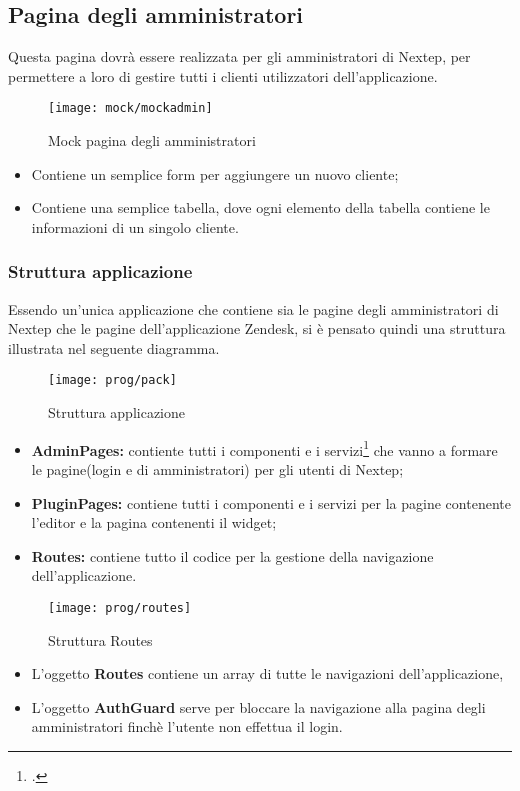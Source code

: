 \subsection{Pagina degli amministratori}
Questa pagina dovrà essere realizzata per gli amministratori di Nextep, per permettere a loro di gestire tutti i clienti utilizzatori dell'applicazione. 
\begin{figure}[!h] 
	\centering 
	\texttt{[image: mock/mockadmin]} 
	\caption{Mock pagina degli amministratori}
\end{figure} 
\newpage 
\begin{itemize}
	\item Contiene un semplice form per aggiungere un nuovo cliente;
	\item Contiene una semplice tabella, dove ogni elemento della tabella contiene le informazioni di un singolo cliente.
\end{itemize}
\subsubsection{Struttura applicazione}
Essendo un'unica applicazione che contiene sia le pagine degli amministratori di Nextep che le pagine dell'applicazione Zendesk, si è pensato quindi una struttura illustrata nel seguente diagramma.
\begin{figure}[!h] 
	\centering 
	\texttt{[image: prog/pack]} 
	\caption{Struttura applicazione}
\end{figure}
\begin{itemize}
	\item \textbf{AdminPages:} contiente tutti i componenti e i servizi\footcite{Nel Appendice si trova una descrizione completa di un servizio Angular} che vanno a formare le pagine(login e di amministratori) per gli utenti di Nextep;
	\item \textbf{PluginPages:} contiene tutti i componenti e i servizi per la pagine contenente l'editor e la pagina contenenti il widget;
	\item \textbf{Routes:} contiene tutto il codice per la gestione della navigazione dell'applicazione.
\end{itemize}
\begin{figure}[!h] 
	\centering 
	\texttt{[image: prog/routes]} 
	\caption{Struttura Routes}
\end{figure}
\begin{itemize}
	\item L'oggetto \textbf{Routes} contiene un array di tutte le navigazioni dell'applicazione,
	\item L'oggetto \textbf{AuthGuard} serve per bloccare la navigazione alla pagina degli amministratori finchè l'utente non effettua il login. 
	\\
\end{itemize}
